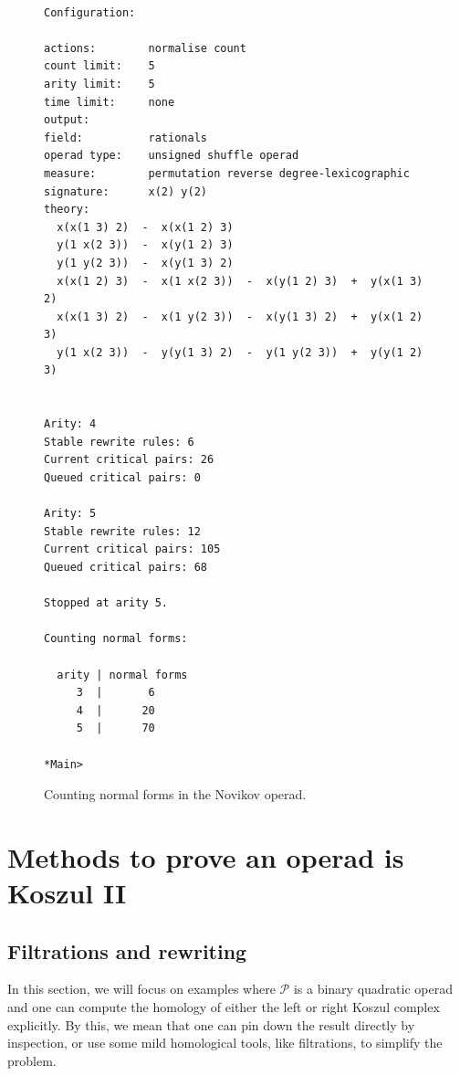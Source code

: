 \documentclass[fleqn, a4paper, twoside]{article}
\newcommand{\0}{\langle 0\rangle}
\DeclareRobustCommand{\[}{\begin{equation}}%
\DeclareRobustCommand{\]}{\end{equation}}%
\theoremstyle{mytheorem}
\theoremstyle{introthm}
\theoremstyle{mydefinition}
\theoremstyle{mydefinition2}
\theoremstyle{plain} %
\newcommand{\?}{\,?\,}
\newcommand{\PP}{{\mathcal{P}}}
\theoremstyle{mytheorem}
\theoremstyle{plain} %
\newcommand\blankpage{%
    \null
    \thispagestyle{empty}%
    \newpage}
\begin{document}
\begin{figure}

\begin{verbatim}

Configuration:

actions:        normalise count 
count limit:    5
arity limit:    5
time limit:     none
output:         
field:          rationals
operad type:    unsigned shuffle operad
measure:        permutation reverse degree-lexicographic 
signature:      x(2) y(2)
theory:
  x(x(1 3) 2)  -  x(x(1 2) 3)
  y(1 x(2 3))  -  x(y(1 2) 3)
  y(1 y(2 3))  -  x(y(1 3) 2)
  x(x(1 2) 3)  -  x(1 x(2 3))  -  x(y(1 2) 3)  +  y(x(1 3) 2)
  x(x(1 3) 2)  -  x(1 y(2 3))  -  x(y(1 3) 2)  +  y(x(1 2) 3)
  y(1 x(2 3))  -  y(y(1 3) 2)  -  y(1 y(2 3))  +  y(y(1 2) 3)


Arity: 4   
Stable rewrite rules: 6   
Current critical pairs: 26   
Queued critical pairs: 0

Arity: 5   
Stable rewrite rules: 12   
Current critical pairs: 105   
Queued critical pairs: 68

Stopped at arity 5.

Counting normal forms:

  arity | normal forms
     3  |       6
     4  |      20
     5  |      70

*Main> 
\end{verbatim}
\caption{Counting normal forms in the Novikov operad.}
\end{figure}
\newpage


\section{Methods to prove an operad is Koszul II}\label{lecture:methods2}

\subsection{Filtrations and rewriting}

In this section, we will focus on examples where
$\PP$ is a binary quadratic operad and one can
compute the homology of either the left or
right Koszul complex explicitly. By this, we
mean that one can pin down the result directly
by inspection, or use some mild homological tools,
like filtrations, to simplify the problem.
\end{document}
